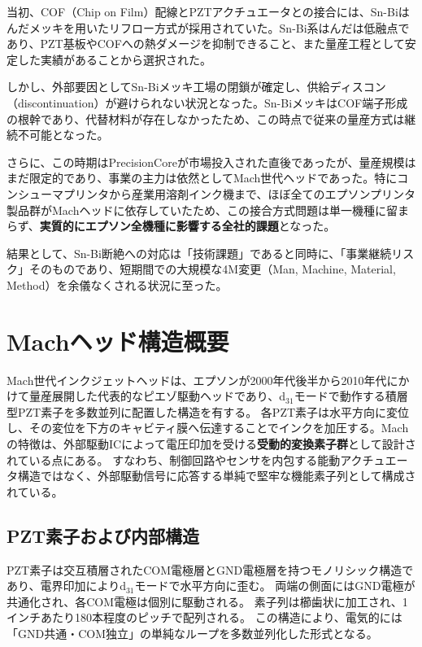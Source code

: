 \documentclass[conference]{IEEEtran}
\begin{document}
当初、COF（Chip on Film）配線とPZTアクチュエータとの接合には、Sn-Biはんだメッキを用いたリフロー方式が採用されていた。Sn-Bi系はんだは低融点であり、PZT基板やCOFへの熱ダメージを抑制できること、また量産工程として安定した実績があることから選択された。  

しかし、外部要因としてSn-Biメッキ工場の閉鎖が確定し、供給ディスコン（discontinuation）が避けられない状況となった。Sn-BiメッキはCOF端子形成の根幹であり、代替材料が存在しなかったため、この時点で従来の量産方式は継続不可能となった。  

さらに、この時期はPrecisionCoreが市場投入された直後であったが、量産規模はまだ限定的であり、事業の主力は依然としてMach世代ヘッドであった。特にコンシューマプリンタから産業用溶剤インク機まで、ほぼ全てのエプソンプリンタ製品群がMachヘッドに依存していたため、この接合方式問題は単一機種に留まらず、\textbf{実質的にエプソン全機種に影響する全社的課題}となった。  

結果として、Sn-Bi断絶への対応は「技術課題」であると同時に、「事業継続リスク」そのものであり、短期間での大規模な4M変更（Man, Machine, Material, Method）を余儀なくされる状況に至った。

\section{Machヘッド構造概要}
Mach世代インクジェットヘッドは、エプソンが2000年代後半から2010年代にかけて量産展開した代表的なピエゾ駆動ヘッドであり、d$_{31}$モードで動作する積層型PZT素子を多数並列に配置した構造を有する。  
各PZT素子は水平方向に変位し、その変位を下方のキャビティ膜へ伝達することでインクを加圧する。Machの特徴は、外部駆動ICによって電圧印加を受ける\textbf{受動的変換素子群}として設計されている点にある。  
すなわち、制御回路やセンサを内包する能動アクチュエータ構造ではなく、外部駆動信号に応答する単純で堅牢な機能素子列として構成されている。

\subsection{PZT素子および内部構造}
PZT素子は交互積層されたCOM電極層とGND電極層を持つモノリシック構造であり、電界印加によりd$_{31}$モードで水平方向に歪む。  
両端の側面にはGND電極が共通化され、各COM電極は個別に駆動される。  
素子列は櫛歯状に加工され、1インチあたり180本程度のピッチで配列される。  
この構造により、電気的には「GND共通・COM独立」の単純なループを多数並列化した形式となる。
\end{document}
